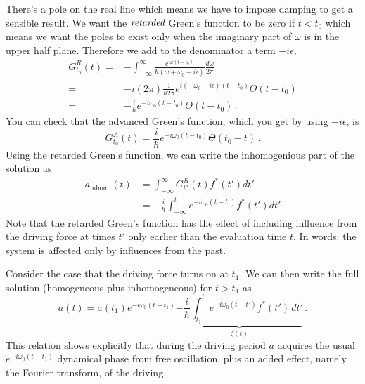 There's a pole on the real line which means we have to impose damping to get a sensible result. We want the $\emph{retarded}$ Green's function to be zero if $t<t_0$ which means we want the poles to exist only when the imaginary part of $\omega$ is in the upper half plane. Therefore we add to the denominator a term $-i\epsilon$,
\begin{align*}
  G_{t_0}^{R}(t)
  =& -\int_{-\infty}^{\infty} \frac{e^{i\omega(t - t_0)}}{\hbar \left(\omega + \omega_0 -i \epsilon\right)} \frac{d\omega}{2\pi} \\
  =& -i \left( 2\pi \right) \frac{1}{\hbar 2\pi} e^{i(-\omega_0 + i \epsilon)(t - t_0)} \Theta(t-t_0) \\
  =& -\frac{i}{\hbar} e^{-i\omega_0(t - t_0)} \Theta(t - t_0)
  \, .
\end{align*}
You can check that the advanced Green's function, which you get by using $+i\epsilon$, is
\begin{equation}
  G_{t_0}^{A}(t) = \frac{i}{\hbar} e^{-i\omega_0 (t - t_0)} \Theta(t_0 - t)
  \, .
\end{equation}
Using the retarded Green's function, we can write the inhomogenious part of the solution as
\begin{align*}
  a_\text{inhom.}(t)
  &= \int_{-\infty}^{\infty}G_{t'}^{R}(t)f^{*}(t')dt' \\
  &= -\frac{i}{\hbar}\int_{-\infty}^{t}e^{-i\omega_0(t-t')}f^{*}(t')dt'
\end{align*}
Note that the retarded Green's function has the effect of including influence from the driving force at times $t'$ only earlier than the evaluation time $t$.
In words: the system is affected only by influences from the past.

Consider the case that the driving force turns on at $t_1$.
We can then write the full solution (homogeneous plus inhomogeneous) for $t > t_1$ as
\begin{equation}
  a(t)
  = a(t_1) e^{-i\omega_0(t - t_1)} \underbrace{- \frac{i}{\hbar} \int_{t_1}^t e^{-i \omega_0(t - t')} f^{*}(t') \, dt'}_{\zeta(t)} \, .
\end{equation}
This relation shows explicitly that during the driving period $a$ acquires the usual $e^{-i\omega_0(t - t_1)}$ dynamical phase from free oscillation, plus an added effect, namely the Fourier transform, of the driving.


